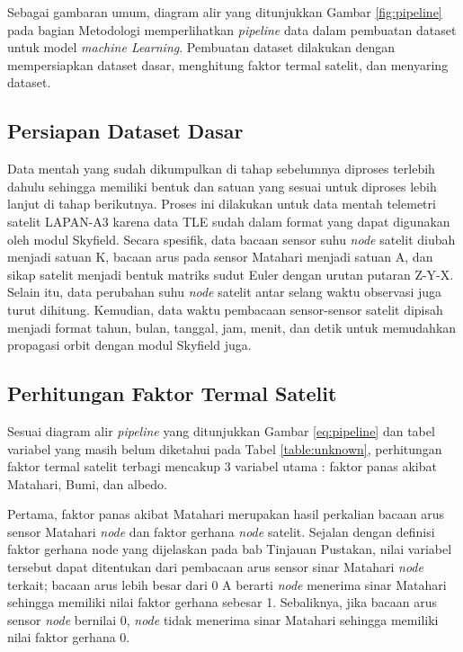 Sebagai gambaran umum, diagram alir yang ditunjukkan Gambar \ref{fig:pipeline}
pada bagian Metodologi memperlihatkan \textit{pipeline} data dalam pembuatan
dataset untuk model \textit{machine Learning}. Pembuatan dataset dilakukan
dengan mempersiapkan dataset dasar, menghitung faktor termal satelit, dan
menyaring dataset.

\subsection{Persiapan Dataset Dasar}

Data mentah yang sudah dikumpulkan di tahap sebelumnya diproses terlebih dahulu
sehingga memiliki bentuk dan satuan yang sesuai untuk diproses lebih lanjut di
tahap berikutnya. Proses ini dilakukan untuk data mentah telemetri satelit
LAPAN-A3 karena data TLE sudah dalam format yang dapat digunakan oleh modul
Skyfield. Secara spesifik, data bacaan sensor suhu \textit{node} satelit diubah
menjadi satuan K, bacaan arus pada sensor Matahari menjadi satuan A, dan sikap
satelit menjadi bentuk matriks sudut Euler dengan urutan putaran Z-Y-X. Selain
itu, data perubahan suhu \textit{node} satelit antar selang waktu observasi
juga turut dihitung. Kemudian, data waktu pembacaan sensor-sensor satelit
dipisah menjadi format tahun, bulan, tanggal, jam, menit, dan detik untuk
memudahkan propagasi orbit dengan modul Skyfield juga.

\subsection{Perhitungan Faktor Termal Satelit}

Sesuai diagram alir \textit{pipeline} yang ditunjukkan Gambar \ref{eq:pipeline}
dan tabel variabel yang masih belum diketahui pada Tabel \ref{table:unknown},
perhitungan faktor termal satelit terbagi mencakup 3 variabel utama : faktor
panas akibat Matahari, Bumi, dan albedo.

Pertama, faktor panas akibat Matahari merupakan hasil perkalian bacaan arus
sensor Matahari \textit{node} dan faktor gerhana \textit{node} satelit. Sejalan
dengan definisi faktor gerhana node yang dijelaskan pada bab Tinjauan Pustakan,
nilai variabel tersebut dapat ditentukan dari pembacaan arus sensor sinar
Matahari \textit{node} terkait; bacaan arus lebih besar dari 0 A berarti
\textit{node} menerima sinar Matahari sehingga memiliki nilai faktor gerhana
sebesar 1. Sebaliknya, jika bacaan arus sensor \textit{node} bernilai 0,
\textit{node} tidak menerima sinar Matahari sehingga memiliki nilai faktor
gerhana 0.

